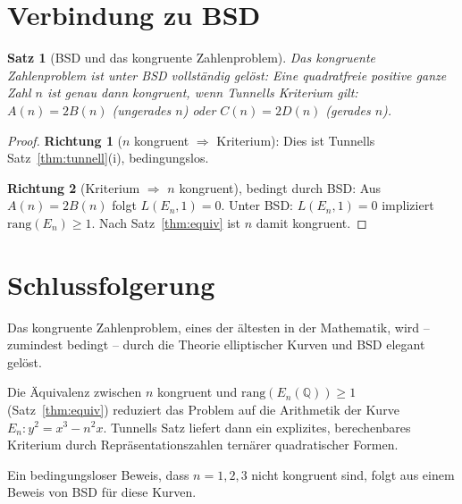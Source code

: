 \documentclass[12pt,a4paper]{amsart}
\newtheorem{theorem}{Satz}[section]
\theoremstyle{definition}
\newcommand{\Q}{\mathbb{Q}}
\begin{document}
\section{Verbindung zu BSD}

\begin{theorem}[BSD und das kongruente Zahlenproblem]
\label{thm:bsd_cong}
Das kongruente Zahlenproblem ist unter BSD vollst\"andig gel\"ost:
Eine quadratfreie positive ganze Zahl $n$ ist genau dann kongruent,
wenn Tunnells Kriterium gilt: $A(n)=2B(n)$ (ungerades $n$) oder
$C(n)=2D(n)$ (gerades $n$).
\end{theorem}

\begin{proof}
\textbf{Richtung 1} ($n$ kongruent $\Rightarrow$ Kriterium):
Dies ist Tunnells Satz~\ref{thm:tunnell}(i), bedingungslos.

\textbf{Richtung 2} (Kriterium $\Rightarrow$ $n$ kongruent), bedingt durch BSD:
Aus $A(n)=2B(n)$ folgt $L(E_n,1)=0$.
Unter BSD: $L(E_n,1)=0$ impliziert $\mathrm{rang}(E_n)\ge 1$.
Nach Satz~\ref{thm:equiv} ist $n$ damit kongruent.
\end{proof}

\section{Schlussfolgerung}

Das kongruente Zahlenproblem, eines der \"altesten in der Mathematik,
wird -- zumindest bedingt -- durch die Theorie elliptischer Kurven und
BSD elegant gel\"ost.

Die \"Aquivalenz zwischen $n$ kongruent und $\mathrm{rang}(E_n(\Q)) \ge 1$
(Satz~\ref{thm:equiv}) reduziert das Problem auf die Arithmetik der
Kurve $E_n: y^2 = x^3 - n^2 x$.
Tunnells Satz liefert dann ein explizites, berechenbares Kriterium
durch Repr\"asentationszahlen tern\"arer quadratischer Formen.

Ein bedingungsloser Beweis, dass $n = 1, 2, 3$ nicht kongruent sind,
folgt aus einem Beweis von BSD f\"ur diese Kurven.
\end{document}

